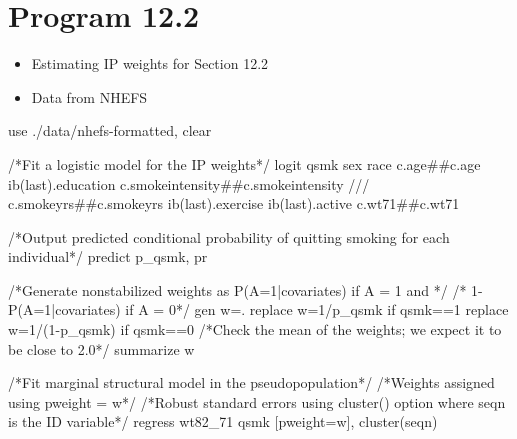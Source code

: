 \documentclass[
  10pt,
  a4paper,
]{book}
\newenvironment{Shaded}{\begin{snugshade}}{\end{snugshade}}
\newcommand{\CommentTok}[1]{\textcolor[rgb]{0.37,0.37,0.37}{#1}}
\newcommand{\FunctionTok}[1]{\textcolor[rgb]{0.28,0.35,0.67}{#1}}
\newcommand{\KeywordTok}[1]{\textcolor[rgb]{0.00,0.46,0.62}{#1}}
\newcommand{\NormalTok}[1]{\textcolor[rgb]{0.00,0.46,0.62}{#1}}
\providecommand{\tightlist}{%
  \setlength{\itemsep}{0pt}\setlength{\parskip}{0pt}}
\begin{document}
\hypertarget{program-12.2-1}{%
\section{Program 12.2}\label{program-12.2-1}}

\begin{itemize}
\tightlist
\item
  Estimating IP weights for Section 12.2
\item
  Data from NHEFS
\end{itemize}

\begin{Shaded}
\begin{Highlighting}[]
\KeywordTok{use}\NormalTok{ ./}\KeywordTok{data}\NormalTok{/nhefs{-}formatted, }\KeywordTok{clear}

\CommentTok{/*Fit a logistic model for the IP weights*/} 
\KeywordTok{logit}\NormalTok{ qsmk sex race c.age\#\#c.age ib(}\FunctionTok{last}\NormalTok{).education c.smokeintensity\#\#c.smokeintensity }\CommentTok{///}
\NormalTok{c.smokeyrs\#\#c.smokeyrs ib(}\FunctionTok{last}\NormalTok{).exercise ib(}\FunctionTok{last}\NormalTok{).active c.wt71\#\#c.wt71 }

\CommentTok{/*Output predicted conditional probability of quitting smoking for each individual*/}
\KeywordTok{predict}\NormalTok{ p\_qsmk, pr}

\CommentTok{/*Generate nonstabilized weights as P(A=1|covariates) if A = 1 and */}
\CommentTok{/* 1{-}P(A=1|covariates) if A = 0*/}
\KeywordTok{gen} \FunctionTok{w}\NormalTok{=.}
\KeywordTok{replace} \FunctionTok{w}\NormalTok{=1/p\_qsmk }\KeywordTok{if}\NormalTok{ qsmk==1}
\KeywordTok{replace} \FunctionTok{w}\NormalTok{=1/(1{-}p\_qsmk) }\KeywordTok{if}\NormalTok{ qsmk==0}
\CommentTok{/*Check the mean of the weights; we expect it to be close to 2.0*/}
\KeywordTok{summarize} \FunctionTok{w}

\CommentTok{/*Fit marginal structural model in the pseudopopulation*/}
\CommentTok{/*Weights assigned using pweight = w*/}
\CommentTok{/*Robust standard errors using cluster() option where \textquotesingle{}seqn\textquotesingle{} is the ID variable*/}
\KeywordTok{regress}\NormalTok{ wt82\_71 qsmk [}\KeywordTok{pweight}\NormalTok{=}\FunctionTok{w}\NormalTok{], }\KeywordTok{cluster}\NormalTok{(seqn) }
\end{Highlighting}
\end{Shaded}
\end{document}
